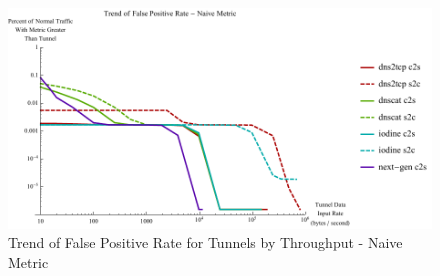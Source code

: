 \documentclass[12pt]{report}
\theoremstyle{remark}
\theoremstyle{definition}
\theoremstyle{definition}
\theoremstyle{definition}
\begin{document}
%

\begin{figure}
\centering
\includegraphics[width=\textwidth]{../figures/cnplot.pdf}
\caption[Trend of False Positive Rate for Tunnels by Throughput - Naive 
Metric]{Trend of False Positive Rate for Tunnels by Throughput - Naive Metric}
\label{cnplot}
\end{figure}
\end{document}
